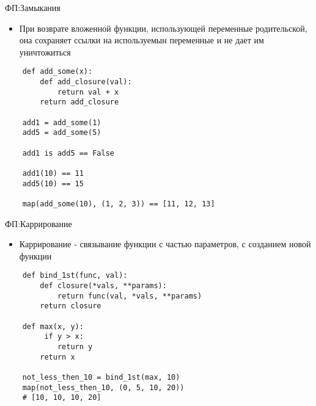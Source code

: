 \documentclass{article}
\begin{document}
\begin{center} ФП:Замыкания \end{center}
\begin{itemize}
    \item При возврате вложенной функции, использующей переменные родительской,
        она сохраняет ссылки на используемын переменные и не дает им уничтожиться
\end{itemize}
\vspace{15pt}
\begin{lstlisting}
    def add_some(x):
        def add_closure(val):
            return val + x
        return add_closure

    add1 = add_some(1)
    add5 = add_some(5)

    add1 is add5 == False

    add1(10) == 11
    add5(10) == 15

    map(add_some(10), (1, 2, 3)) == [11, 12, 13]
\end{lstlisting}
\newpage

\begin{center} ФП:Каррирование \end{center}
\begin{itemize}
    \item Каррирование - связывание функции с частью параметров, с созданием новой функции
\end{itemize}
\vspace{15pt}
\begin{lstlisting}
    def bind_1st(func, val):
        def closure(*vals, **params):
            return func(val, *vals, **params)
        return closure

    def max(x, y):
         if y > x:
            return y
        return x

    not_less_then_10 = bind_1st(max, 10)
    map(not_less_then_10, (0, 5, 10, 20))
    # [10, 10, 10, 20]
\end{lstlisting}
\newpage
\end{document}
